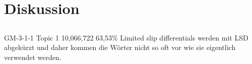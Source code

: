 \chapter{Diskussion}

\section{}
GM-3-1-1
Topic 1 
10,066,722	63,53\%
Limited slip differentials werden mit LSD abgekürzt und daher kommen die Wörter nicht so oft vor wie sie eigentlich verwendet werden.